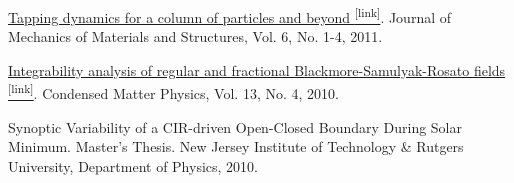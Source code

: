 \begin{itemize*}
  \item \label{itm:gran-2011-tapping}
    \href{http://msp.berkeley.edu/jomms/2011/6-1/jomms-v6-n1-p06-s.pdf}{
    Tapping dynamics for a column of particles and beyond
    \textsuperscript{\tiny{[link]}}}. 
    Journal of Mechanics of Materials and Structures, Vol. 6, No. 1-4, 2011.

  \item \label{itm:gran-2010-fractional}
    \href{http://www.icmp.lviv.ua/journal/zbirnyk.64/}{
    Integrability analysis of regular and fractional Blackmore-Samulyak-Rosato fields
    \textsuperscript{\tiny{[link]}}}.  
    Condensed Matter Physics, Vol. 13, No. 4, 2010. 

  \item \label{itm:sw-2010-masters}
    Synoptic Variability of a {CIR}-driven Open-{C}losed Boundary During Solar Minimum.
    Master's Thesis. New Jersey Institute of Technology \& Rutgers University,
    Department of Physics, 2010.

\end{itemize*}
